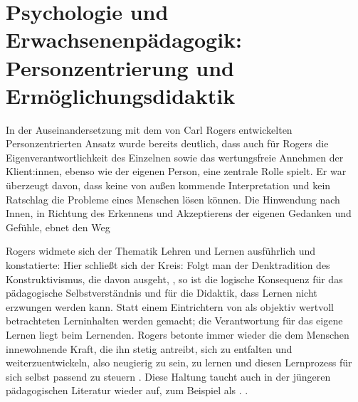 \documentclass[
  twoside,
  parskip=half-,
  paper=176mm:246mm,
  BCOR=14mm,
  DIV=14,
]{scrreprt}
\begin{document}
\section{Psychologie und Erwachsenenpädagogik: Personzentrierung und Ermöglichungsdidaktik} In der Auseinandersetzung mit dem von Carl Rogers entwickelten Personzentrierten Ansatz wurde bereits deutlich, dass auch für Rogers die Eigenverantwortlichkeit des Einzelnen sowie das wertungsfreie Annehmen der Klient:innen, ebenso wie der eigenen Person, eine zentrale Rolle spielt. Er war überzeugt davon, dass keine von außen kommende Interpretation und kein Ratschlag die Probleme eines Menschen lösen können. Die Hinwendung nach Innen, in Richtung des Erkennens und Akzeptierens der eigenen Gedanken und Gefühle, ebnet den Weg 

 Rogers widmete sich der Thematik Lehren und Lernen ausführlich und konstatierte:   Hier schließt sich der Kreis: Folgt man der Denktradition des Konstruktivismus, die davon ausgeht, , so ist die logische Konsequenz für das pädagogische Selbstverständnis und für die Didaktik, dass Lernen nicht erzwungen werden kann. Statt einem Eintrichtern von als objektiv wertvoll betrachteten Lerninhalten werden  gemacht; die Verantwortung für das eigene Lernen liegt beim Lernenden. Rogers betonte immer wieder die dem Menschen innewohnende Kraft, die ihn stetig antreibt, sich zu entfalten und weiterzuentwickeln, also neugierig zu sein, zu lernen und diesen Lernprozess für sich selbst passend zu steuern \autocite[vgl.][157]{rogersLernenFreiheit}. Diese Haltung taucht auch in der jüngeren pädagogischen Literatur wieder auf, zum Beispiel als . . 
\end{document}
